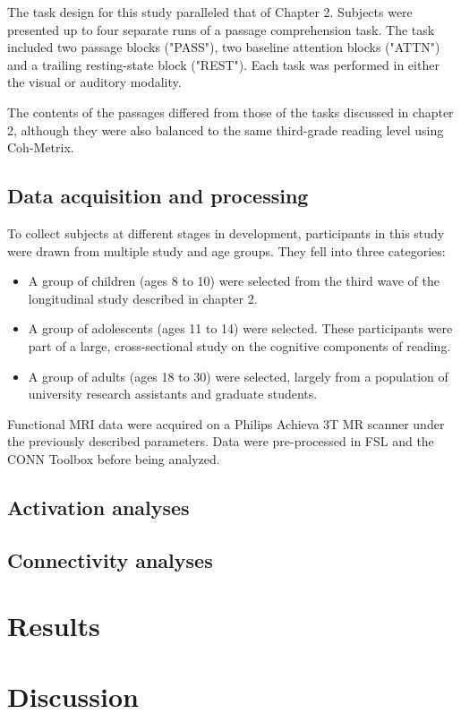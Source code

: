 The task design for this study paralleled that of Chapter 2. Subjects were presented up to four separate runs of a passage comprehension task. The task included two passage blocks ("PASS"), two baseline attention blocks ("ATTN") and a trailing resting-state block ("REST"). Each task was performed in either the visual or auditory modality.

The contents of the passages differed from those of the tasks discussed in chapter 2, although they were also balanced to the same third-grade reading level using Coh-Metrix. 

\subsection{Data acquisition and processing}

To collect subjects at different stages in development, participants in this study were drawn from multiple study and age groups. They fell into three categories:

\begin{itemize}
	\item A group of children (ages 8 to 10) were selected from the third wave of the longitudinal study described in chapter 2. 
	\item A group of adolescents (ages 11 to 14) were selected. These participants were part of a large, cross-sectional study on the cognitive components of reading.
	\item A group of adults (ages 18 to 30) were selected, largely from a population of university research assistants and graduate students.
\end{itemize}

Functional MRI data were acquired on a Philips Achieva 3T MR scanner under the previously described parameters. Data were pre-processed in FSL and the CONN Toolbox before being analyzed.

\subsection{Activation analyses}



\subsection{Connectivity analyses}


\section{Results}


\section{Discussion}


